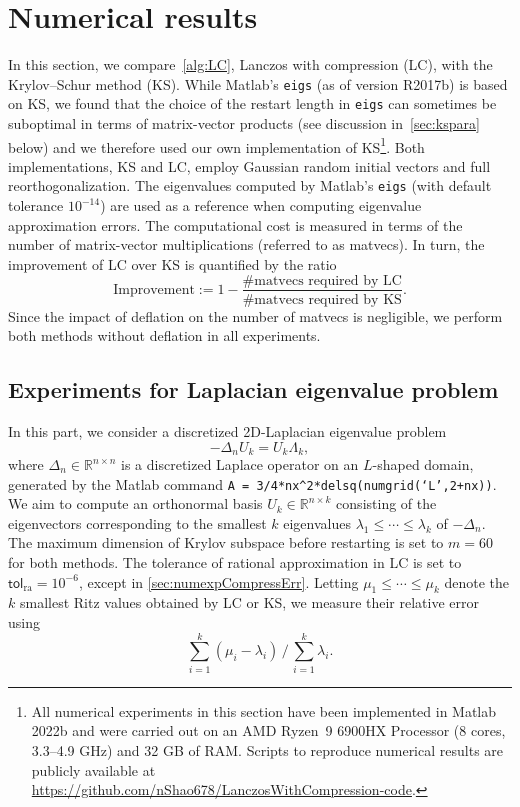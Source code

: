 \documentclass{siamart190516}
\newcommand{\tol}{\mathsf{tol}}
\newcommand{\defi}{:=}
\newcommand{\R}{\mathbb{R}}
\begin{document}
\section{Numerical results} \label{sec:numericalresults}
In this section, we compare~\cref{alg:LC}, Lanczos with compression (LC), with the Krylov--Schur method (KS). While Matlab's \texttt{eigs} (as of version R2017b) is based on KS, we found that the choice of the restart length in \texttt{eigs} can sometimes be suboptimal in terms of matrix-vector products (see discussion in~\cref{sec:kspara} below) and we therefore used our own implementation of KS\footnote{All numerical experiments in this section have been implemented in Matlab 2022b and were carried out on an AMD Ryzen~9 6900HX Processor (8 cores, 3.3--4.9 GHz) and 32 GB of RAM. Scripts to reproduce numerical results are publicly available at \url{https://github.com/nShao678/LanczosWithCompression-code}.}.
Both implementations, KS and LC, employ Gaussian random initial vectors and full reorthogonalization. The eigenvalues computed by Matlab's \texttt{eigs} (with default tolerance $10^{-14}$) are used as a reference when computing eigenvalue approximation errors.
The computational cost is measured in terms of the number of matrix-vector multiplications (referred to as matvecs). In turn, the improvement of LC over KS is quantified by the ratio
\begin{equation}
    \label{defimprovement}
    \text{Improvement}\defi 1-\frac{\text{$\#$matvecs required by LC}}{\text{$\#$matvecs required by KS}}.
\end{equation}
Since the impact of deflation on the number of matvecs is negligible, we perform both methods without deflation in all experiments.






\subsection{Experiments for Laplacian eigenvalue problem}

In this part, we consider a discretized 2D-Laplacian eigenvalue problem
\begin{equation*}
    -\Delta_{n}U_{k}=U_{k}\Lambda_{k},
\end{equation*}
where $\Delta_{n} \in \R^{n\times n}$ is a discretized Laplace operator on an $L$-shaped domain, generated by the Matlab command \texttt{A = 3/4*nx\^{}2*delsq(numgrid(`L',2+nx))}. We aim to compute an orthonormal basis $U_{k} \in \R^{n\times k}$ consisting of the eigenvectors corresponding to the smallest $k$ eigenvalues $\lambda_1\le \cdots \le \lambda_k$ of $-\Delta_{n}$. 
The maximum dimension of Krylov subspace before restarting is set to $m=60$ for both methods. 
The tolerance of rational approximation in LC is set to $\tol_{\mathrm{ra}}=10^{-6}$, except in \cref{sec:numexpCompressErr}.
Letting $\mu_1 \le \cdots \le \mu_k$ denote the $k$ smallest Ritz values obtained by LC or KS, we measure their relative error using
\begin{equation} \label{eq:errorritz}
\sum_{i=1}^{k}(\mu_{i}-\lambda_{i}) \,\bigg/\, \sum_{i=1}^{k}\lambda_{i}. 
\end{equation}
\end{document}

